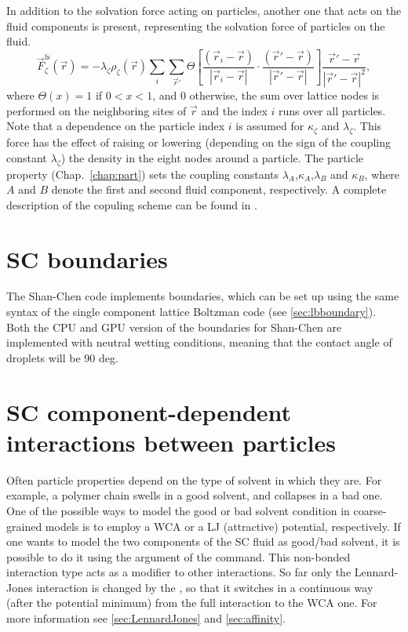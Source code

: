 In addition to the solvation force acting on particles, another one
that acts on the fluid components is present, representing the
solvation force of particles on the fluid.
\begin{equation}
  \vec{F}_{\zeta}^{\mathrm{fs}}(\vec{r}) = -\lambda_{\zeta} \rho_{\zeta}(\vec{r}) \sum_i \sum_{\vec{r}'} \Theta \left[\frac{(\vec{r}_i-\vec{r})}{|\vec{r}_i-\vec{r}|} \cdot \frac{(\vec{r}'-\vec{r})}{|\vec{r}'-\vec{r}|} \right] \frac{\vec{r}'-\vec{r}}{|\vec{r}'-\vec{r}|^2},
\end{equation}
where $\Theta(x)=1$ if $0<x<1$, and 0 otherwise, the sum over lattice
nodes is performed on the neighboring sites of $\vec{r}$ and the index
$i$ runs over all particles. Note that a dependence on the particle
index $i$ is assumed for $\kappa_\zeta$ and $\lambda_\zeta$.  This
force has the effect of raising or lowering (depending on the sign of
the coupling constant $\lambda_\zeta$) the density in the eight nodes
around a particle.  The particle property 
(Chap.~\ref{chap:part}) sets the coupling constants
$\lambda_A$,$\kappa_A$,$\lambda_B$ and $\kappa_B$, where $A$ and $B$
denote the first and second fluid component, respectively.  A complete
description of the copuling scheme can be found in \cite{sega13c}.

\section{SC boundaries\label{sec:scmd-boundaries}}
The Shan-Chen code implements boundaries, which can be set up using the same syntax of the single component lattice Boltzman code (see \ref{sec:lbboundary}). Both the CPU and GPU version of the boundaries for Shan-Chen are implemented with neutral wetting conditions, meaning that the contact angle of droplets will be 90 deg.

\section{SC component-dependent interactions between particles}
\label{sec:scmd-affinity}

Often particle properties depend on the type of solvent in which they
are. For example, a polymer chain swells in a good solvent, and
collapses in a bad one. One of the possible ways to model the good or
bad solvent condition in coarse-grained models is to employ a WCA or a
LJ (attractive) potential, respectively. If one wants to model the two
components of the SC fluid as good/bad solvent, it is possible to do
it using the  argument of the  command. This
non-bonded interaction type acts as a modifier to other
interactions. So far only the Lennard-Jones interaction is changed by
the , so that it switches in a continuous way (after the
potential minimum) from the full interaction to the WCA one. For more
information see \ref{sec:LennardJones} and \ref{sec:affinity}.

